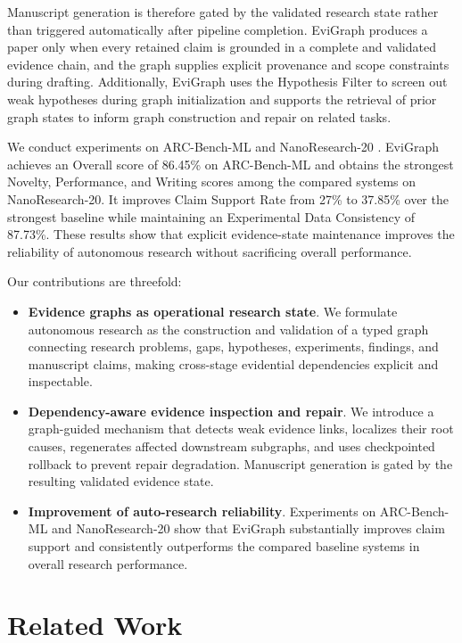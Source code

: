 \documentclass[letterpaper]{article} %
\begin{document}
Manuscript generation is therefore gated by the validated research state rather than triggered automatically after pipeline completion. EviGraph produces a paper only when every retained claim is grounded in a complete and validated evidence chain, and the graph supplies explicit provenance and scope constraints during drafting. Additionally, EviGraph uses the Hypothesis Filter to screen out weak hypotheses during graph initialization and supports the retrieval of prior graph states to inform graph construction and repair on related tasks.

We conduct experiments on ARC-Bench-ML \cite{autoresearchclaw2026} and NanoResearch-20 \cite{nanoresearch2026}. EviGraph achieves an Overall score of 86.45\% on ARC-Bench-ML and obtains the strongest Novelty, Performance, and Writing scores among the compared systems on NanoResearch-20. It improves Claim Support Rate from 27\% to 37.85\% over the strongest baseline while maintaining an Experimental Data Consistency of 87.73\%. These results show that explicit evidence-state maintenance improves the reliability of autonomous research without sacrificing overall performance.

Our contributions are threefold:

\begin{itemize}

    \item \textbf{Evidence graphs as operational research state}. We formulate autonomous research as the construction and validation of a typed graph connecting research problems, gaps, hypotheses, experiments, findings, and manuscript claims, making cross-stage evidential dependencies explicit and inspectable.
    \item \textbf{Dependency-aware evidence inspection and repair}. We introduce a graph-guided mechanism that detects weak evidence links, localizes their root causes, regenerates affected downstream subgraphs, and uses checkpointed rollback to prevent repair degradation. Manuscript generation is gated by the resulting validated evidence state.
    \item \textbf{Improvement of auto-research reliability}. Experiments on ARC-Bench-ML and NanoResearch-20 show that EviGraph substantially improves claim support and consistently outperforms the compared baseline systems in overall research performance.

\end{itemize}


\section{Related Work}
\label{sec:related}
\end{document}
